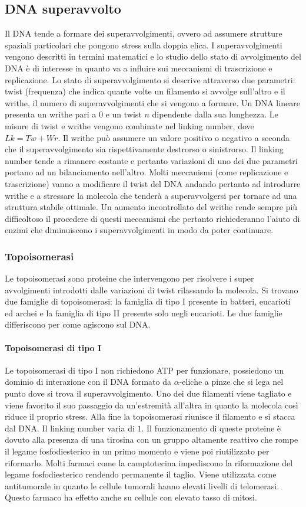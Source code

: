 \subsection{DNA superavvolto}
Il DNA tende a formare dei superavvolgimenti, ovvero ad assumere strutture spaziali particolari che pongono stress sulla doppia elica. I superavvolgimenti vengono descritti in termini
matematici e lo studio dello stato di avvolgimento del DNA \`e di interesse in quanto va a influire sui meccanismi di trascrizione e replicazione. Lo stato di superavvolgimento si 
descrive attraverso due parametri: twist (frequenza) che indica quante volte un filamento si avvolge sull'altro e il writhe, il numero di superavvolgimenti che si vengono a formare. 
Un DNA lineare presenta un writhe pari a $0$ e un twist $n$ dipendente dalla sua lunghezza. Le misure di twist e writhe vengono combinate nel linking number, dove $Lk=Tw+Wr$. Il
writhe pu\`o assumere un valore positivo o negativo a seconda che il superavvolgimento sia rispettivamente destrorso o sinistrorso. Il linking number tende a rimanere costante e 
pertanto variazioni di uno dei due parametri portano ad un bilanciamento nell'altro. Molti meccanismi (come replicazione e trascrizione) vanno a modificare il twist del DNA andando 
pertanto ad introdurre writhe e a stressare la molecola che tender\`a a superavvolgersi per tornare ad una struttura stabile ottimale. Un aumento incontrollato del writhe rende sempre
pi\`u difficoltoso il procedere di questi meccanismi che pertanto richiederanno l'aiuto di enzimi che diminuiscono i superavvolgimenti in modo da poter continuare.
\subsubsection{Topoisomerasi}
Le topoisomerasi sono proteine che intervengono per risolvere i super avvolgimenti introdotti dalle variazioni di twist rilassando la molecola. Si trovano due famiglie di topoisomerasi:
la famiglia di tipo I presente in batteri, eucarioti ed archei e la famiglia di tipo II presente solo negli eucarioti. Le due famiglie differiscono per come agiscono sul DNA.
\paragraph{Topoisomerasi di tipo I} 
Le topoisomerasi di tipo I non richiedono ATP per funzionare, possiedono un dominio di interazione con il DNA formato da $\alpha$-eliche a pinze che si lega nel punto dove si trova il
superavvolgimento. Uno dei due filamenti viene tagliato e viene favorito il suo passaggio da un'estremit\`a all'altra in quanto la molecola cos\`i riduce il proprio stress. Alla fine 
la topoisomerasi riunisce il filamento e si stacca dal DNA. Il linking number varia di $1$. Il funzionamento di queste proteine \`e dovuto alla presenza di una tirosina con un gruppo
 altamente reattivo che rompe il legame fosfodiesterico in un primo momento e viene poi riutilizzato per riformarlo. Molti farmaci come la camptotecina impediscono la riformazione
del legame fosfodiesterico rendendo permanente il taglio. Viene utilizzata come antitumorale in quanto le cellule tumorali hanno elevati livelli di telomerasi. Questo farmaco ha effetto
anche su cellule con elevato tasso di mitosi.
